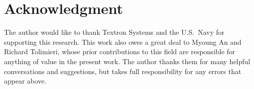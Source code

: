 %
%


\section*{Acknowledgment}
The author would like to thank Textron Systems and the U.S.~Navy
for supporting this research.  This work also owes a great deal to Myoung
An and Richard Tolimieri, whose prior contributions to this field are
responsible for anything of value in the present work. The author thanks them
for many helpful conversations and suggestions, but takes full responsibility for any
errors that appear above.
